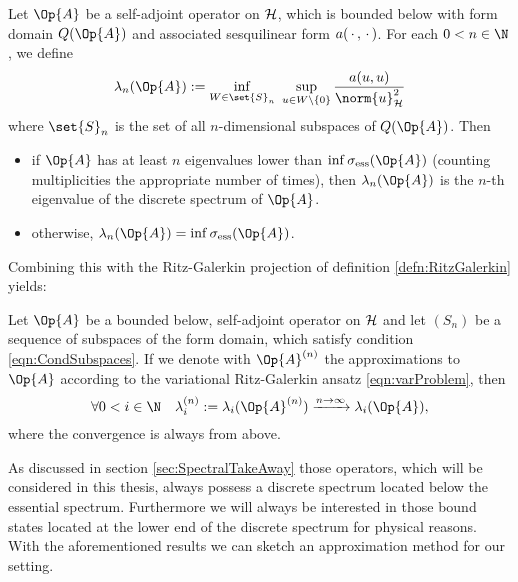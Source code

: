\begin{thm}
	\label{thm:CourantFischer}
	Let $\Op{A}$ be a self-adjoint operator on $\mathcal{H}$,
	which is bounded below with form domain $Q(\Op{A})$
	and associated sesquilinear form $a(\,\cdot\,,\,\cdot\,)$.
	For each $0 < n \in \N$, we define
	\begin{equation}
		\lambda_n(\Op{A}) := \inf_{W \in \set{S}_n} \ \sup_{u \in W \backslash \{0\}}
		\frac{a(u,u)}{\norm{u}_\hilbert^2}
		\label{eqn:CourantFischer}
	\end{equation}
	where $\set{S}_n$ is the set of all $n$-dimensional subspaces of $Q(\Op{A})$.
	Then
	\begin{itemize}
		\item if $\Op{A}$ has at least $n$ eigenvalues lower
			than $\inf \sigma_\text{ess}(\Op{A})$ (counting multiplicities
			the appropriate number of times),
			then $\lambda_n(\Op{A})$ is the $n$-th eigenvalue of the discrete spectrum
			of $\Op{A}$.
		\item otherwise, $\lambda_n(\Op{A}) = \inf \sigma_\text{ess}(\Op{A})$.
	\end{itemize}
\end{thm}

\noindent
Combining this with the Ritz-Galerkin projection of definition \ref{defn:RitzGalerkin}
yields:

\begin{cor}
	\label{cor:Convergence}
	Let $\Op{A}$ be a bounded below, self-adjoint operator on $\mathcal{H}$
	and let $(S_n)$ be a sequence of subspaces of the form domain,
	which satisfy condition \eqref{eqn:CondSubspaces}.
	If we denote with $\Op{A}^{(n)}$
	the approximations to $\Op{A}$
	according to the variational Ritz-Galerkin ansatz
	\eqref{eqn:varProblem}, then
	\[ \forall 0 < i \in \N \quad \lambda^{(n)}_i := \lambda_i(\Op{A}^{(n)}) \xrightarrow{n\to\infty} \lambda_i(\Op{A}), \]
	where the convergence is always from above.
\end{cor}

As discussed in section \vref{sec:SpectralTakeAway}
those operators,
which will be considered in this thesis,
always possess a discrete spectrum located below the essential spectrum.
Furthermore we will always be interested
in those bound states located at the lower end of the discrete spectrum
for physical reasons.
With the aforementioned results we can
sketch an approximation method for our setting.

